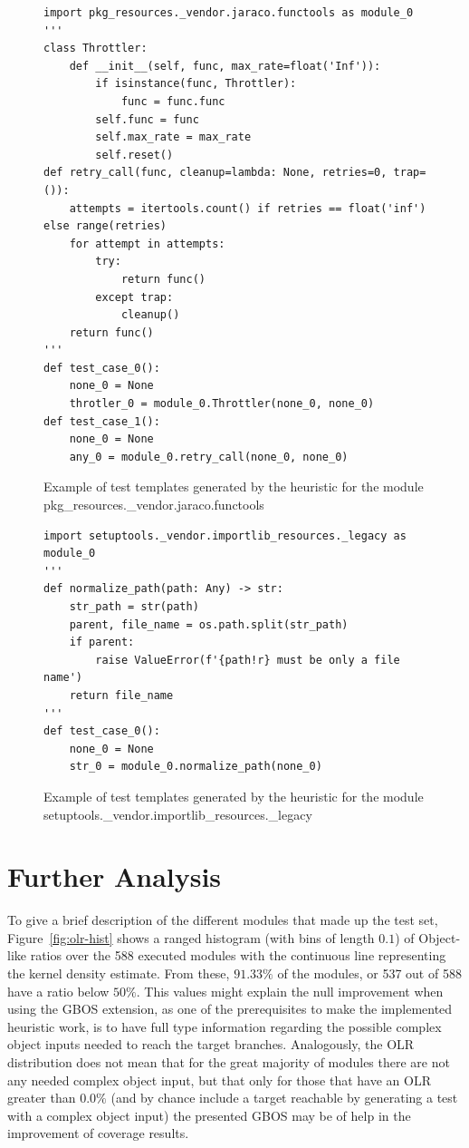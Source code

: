 \documentclass[%
  chapterprefix=false,%
  open=right,%
  twoside=true,%
  paper=a4,%
  logofile={Figures/logo.png},%
  thesistype=master,%
  UKenglish,%
]{se2thesis}
\begin{document}
\begin{figure}
\begin{verbatim}
import pkg_resources._vendor.jaraco.functools as module_0
'''
class Throttler:
    def __init__(self, func, max_rate=float('Inf')):
        if isinstance(func, Throttler):
            func = func.func
        self.func = func
        self.max_rate = max_rate
        self.reset()
def retry_call(func, cleanup=lambda: None, retries=0, trap=()):
    attempts = itertools.count() if retries == float('inf') else range(retries)
    for attempt in attempts:
        try:
            return func()
        except trap:
            cleanup()
    return func()
'''
def test_case_0():
    none_0 = None
    throtler_0 = module_0.Throttler(none_0, none_0)
def test_case_1():
    none_0 = None
    any_0 = module_0.retry_call(none_0, none_0)
\end{verbatim}
\caption{Example of test templates generated by the heuristic for the module pkg\_resources.\_vendor.jaraco.functools}\label{lst:12}
\end{figure}

\begin{figure}
\begin{verbatim}
import setuptools._vendor.importlib_resources._legacy as module_0
'''
def normalize_path(path: Any) -> str:
    str_path = str(path)
    parent, file_name = os.path.split(str_path)
    if parent:
        raise ValueError(f'{path!r} must be only a file name')
    return file_name
'''
def test_case_0():
    none_0 = None
    str_0 = module_0.normalize_path(none_0)
\end{verbatim}
\caption{Example of test templates generated by the heuristic for the module setuptools.\_vendor.importlib\_resources.\_legacy}\label{lst:13}
\end{figure}

\newpage

\section{Further Analysis}\label{sec:further}

To give a brief description of the different modules that made up the test set, Figure~\ref{fig:olr-hist} shows a ranged histogram (with bins of length \(0.1\)) of Object-like ratios over the 588 executed modules with the continuous line representing the kernel density estimate.
From these, \(91.33\%\) of the modules, or 537 out of 588 have a ratio below \(50\%\).
This values might explain the null improvement when using the GBOS extension, as one of the prerequisites to make the implemented heuristic work, is to have full type information regarding the possible complex object inputs needed to reach the target branches.
Analogously, the OLR distribution does not mean that for the great majority of modules there are not any needed complex object input, but that only for those that have an OLR greater than \(0.0\%\) (and by chance include a target reachable by generating a test with a complex object input) the presented GBOS may be of help in the improvement of coverage results.
\end{document}
